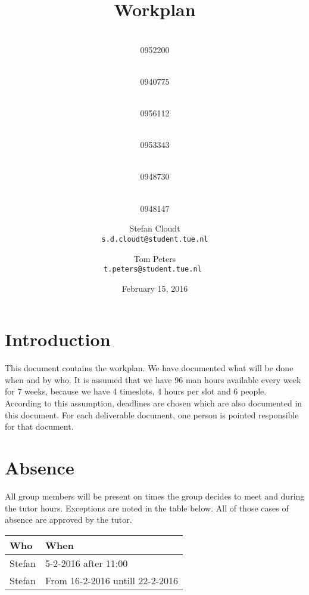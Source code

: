 \documentclass[a4paper,oneside,11pt]{article}
\title{\vspace{-\baselineskip}\sffamily\bfseries Workplan}
\author{
	\makebox[.25\linewidth]{Sergio van Amerongen}\\0952200 \and
	\makebox[.25\linewidth]{Stefan Cloudt}\\0940775 \and
	\makebox[.25\linewidth]{Daan de Graaf}\\0956112 \and
	\makebox[.25\linewidth]{Robert van Lente}\\0953343 \and
	\makebox[.25\linewidth]{Tom Peters}\\0948730 \and
	\makebox[.25\linewidth]{Berrie Trippe}\\0948147 
	\and \makebox[.75\linewidth]{\textbf{Responsible:}} \and
	Stefan Cloudt\\\tt{s.d.cloudt@student.tue.nl}\and Tom Peters 		\\\tt{t.peters@student.tue.nl}
}
\date{February 15, 2016}
\begin{document}
\maketitle

\section{Introduction}
This document contains the workplan. We have documented what will be done when and by who. It is assumed that we have 96 man hours available every week for 7 weeks, because we have 4 timeslots, 4 hours per slot and 6 people. According to this assumption, deadlines are chosen which are also documented in this document. For each deliverable document, one person is pointed responsible for that document.

\section{Absence}
All group members will be present on times the group decides to meet and during the tutor hours. Exceptions are noted in the table below. All of those cases of absence are approved by the tutor.\\
\begin{center}
\begin{tabular}{|l|l|}
\hline
Who & When\\
\hline
Stefan & 5-2-2016 after 11:00\\
\hline
Stefan & From 16-2-2016 untill 22-2-2016\\
\hline
\end{tabular}
\end{center}
\end{document}
